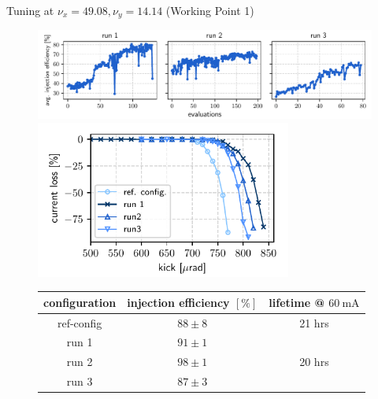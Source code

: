 \documentclass[aspectratio=169]{beamer}
\begin{document}
\begin{frame}{Tuning at $\nu_x = 49.08, \nu_y = 14.14$ (Working Point 1)}
    \begin{minipage}{0.56\textwidth}
        \begin{figure}
            \centering
            \includegraphics[width=\textwidth]{oldtunes_history.pdf}
            \pause
            \includegraphics[width = 0.75\textwidth]{WEPL087_f1.pdf}
            \pause
            \scriptsize
            \begin{table}[]
                \begin{tabular}{ccc}
                \hline
                configuration & injection efficiency $[\%]$ & lifetime @ $\unit{60~\milli\ampere}$ \\ \hline
                ref-config    & $88\pm8$                    & 21 hrs    \\
                run 1         & $91\pm1$                    &           \\
                run 2         & $98\pm1$                    &  20 hrs   \\
                run 3         & $87\pm3$                    &           \\ \hline
                \end{tabular}
                \end{table}
        \end{figure}
    \end{minipage}
    \pause
    \hfill
    \begin{minipage}{0.42\textwidth}

\end{minipage}
\end{frame}
\end{document}
